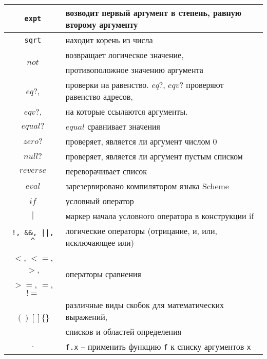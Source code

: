 \begin{itemize}
\begin{table}[ht!]
\begin{tabular}{|c|l|}
                        \verb!expt!                 & возводит первый аргумент в степень, равную второму аргументу \\ \hline
                        \verb!sqrt!                 & находит корень из числа \\ \hline
                        \multirow{2}{*}{$not$}      & возвращает логическое значение,\\
                                                    & противоположное значению аргумента \\ \hline
                        $eq?$,                      & проверки на равенство. $eq?$, $eqv?$ проверяют равенство адресов,\\
                        $eqv?$,                     & на которые ссылаются аргументы.\\
                        $equal?$                    & $equal$ сравнивает значения \\ \hline
                        $zero?$                     & проверяет, является ли аргумент числом 0 \\ \hline
                        $null?$                     & проверяет, является ли аргумент пустым списком \\ \hline
                        $reverse$                   & переворачивает список \\ \hline
                        $eval$                      & зарезервировано компилятором языка Scheme \\ \hline
                        $if$                        & условный оператор \\ \hline
                        $|$                         & маркер начала условного оператора в конструкции if \\ \hline
                        \verb$!, &&, ||, ^$         & логические операторы (отрицание, и, или, исключающее или) \\ \hline
                        $<$, $<=$, $>$,             & \multirow{2}{*}{операторы сравнения} \\
                        $>=$, $=$, $!=$             & \\ \hline
                        \multirow{2}{*}{$( ) [ ] \{ \}$} & различные виды скобок для математических выражений,\\
                                                    & списков и областей определения} \\ \hline
                        $.$                         & \verb,f.x, -- применить функцию \verb,f, к списку аргументов \verb,x, \\ \hline

\end{tabular}
\end{table}
\end{itemize}
